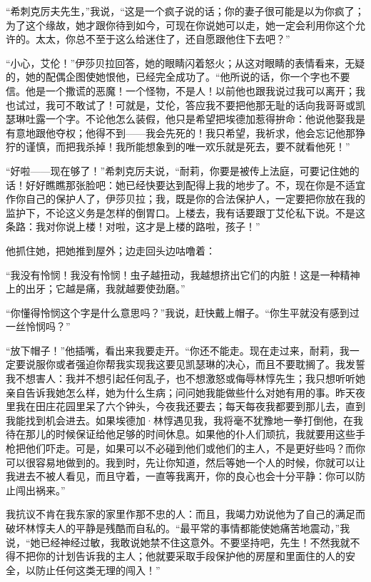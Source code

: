 \par “希刺克厉夫先生，”我说，“这是一个疯子说的话；你的妻子很可能是以为你疯了；为了这个缘故，她才跟你待到如今，可现在你说她可以走，她一定会利用你这个允许的。太太，你总不至于这么给迷住了，还自愿跟他住下去吧？”
\par “小心，艾伦！”伊莎贝拉回答，她的眼睛闪着怒火；从这对眼睛的表情看来，无疑的，她的配偶企图使她恨他，已经完全成功了。“他所说的话，你一个字也不要信。他是一个撒谎的恶魔！一个怪物，不是人！以前他也跟我说过我可以离开；我也试过，我可不敢试了！可就是，艾伦，答应我不要把他那无耻的话向我哥哥或凯瑟琳吐露一个字。不论他怎么装假，他只是希望把埃德加惹得拚命：他说他娶我是有意地跟他夺权；他得不到——我会先死的！我只希望，我祈求，他会忘记他那狰狞的谨慎，而把我杀掉！我所能想象到的唯一欢乐就是死去，要不就看他死！”
\par “好啦——现在够了！”希刺克厉夫说，“耐莉，你要是被传上法庭，可要记住她的话！好好瞧瞧那张脸吧：她已经快要达到配得上我的地步了。不，现在你是不适宜作你自己的保护人了，伊莎贝拉；我，既是你的合法保护人，一定要把你放在我的监护下，不论这义务是怎样的倒胃口。上楼去，我有话要跟丁艾伦私下说。不是这条路：我对你说上楼！对啦，这才是上楼的路啦，孩子！”
\par 他抓住她，把她推到屋外；边走回头边咕噜着：
\par “我没有怜悯！我没有怜悯！虫子越扭动，我越想挤出它们的内脏！这是一种精神上的出牙；它越是痛，我就越要使劲磨。”
\par “你懂得怜悯这个字是什么意思吗？”我说，赶快戴上帽子。“你生平就没有感到过一丝怜悯吗？”
\par “放下帽子！”他插嘴，看出来我要走开。“你还不能走。现在走过来，耐莉，我一定要说服你或者强迫你帮我实现我这要见凯瑟琳的决心，而且不要耽搁了。我发誓我不想害人：我并不想引起任何乱子，也不想激怒或侮辱林惇先生；我只想听听她亲自告诉我她怎么样，她为什么生病；问问她我能做些什么对她有用的事。昨天夜里我在田庄花园里呆了六个钟头，今夜我还要去；每天每夜我都要到那儿去，直到我能找到机会进去。如果埃德加·林惇遇见我，我将毫不犹豫地一拳打倒他，在我待在那儿的时候保证给他足够的时间休息。如果他的仆人们顽抗，我就要用这些手枪把他们吓走。可是，如果可以不必碰到他们或他们的主人，不是更好些吗？而你可以很容易地做到的。我到时，先让你知道，然后等她一个人的时候，你就可以让我进去不被人看见，而且守着，一直等我离开，你的良心也会十分平静：你可以防止闯出祸来。”
\par 我抗议不肯在我东家的家里作那不忠的人：而且，我竭力劝说他为了自己的满足而破坏林惇夫人的平静是残酷而自私的。“最平常的事情都能使她痛苦地震动，”我说，“她已经神经过敏，我敢说她禁不住这意外。不要坚持吧，先生！不然我就不得不把你的计划告诉我的主人；他就要采取手段保护他的房屋和里面住的人的安全，以防止任何这类无理的闯入！”
